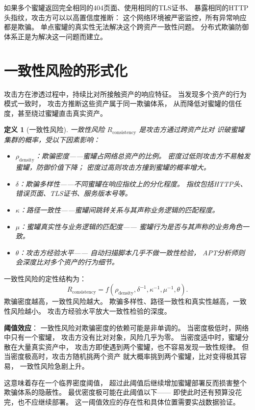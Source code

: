 \documentclass[11pt,a4paper]{article}
\newtheorem{definition}{定义}[section]
\begin{document}
如果多个蜜罐返回完全相同的404页面、使用相同的TLS证书、
暴露相同的HTTP头指纹，攻击方可以以高置信度推断：
这个网络环境被严密监控，所有异常响应都是欺骗。
单点蜜罐的真实性无法解决这个跨资产一致性问题。
分布式欺骗防御体系正是为解决这一问题而建立。

\section{一致性风险的形式化}

攻击方在渗透过程中，持续比对所接触资产的响应特征。
当发现多个资产的行为模式一致时，
攻击方推断这些资产属于同一欺骗体系，
从而降低对蜜罐的信任度，甚至绕过蜜罐直击真实资产。

\begin{definition}[一致性风险]
一致性风险 \(R_{\text{consistency}}\) 是攻击方通过跨资产比对
识破蜜罐集群的概率，受以下因素影响：
\begin{itemize}
    \item \(\rho_{\text{density}}\)：欺骗密度——蜜罐占网络总资产的比例。
          密度过低则攻击方不易触发蜜罐，防御价值下降；
          密度过高则攻击方撞到蜜罐的概率增大。
    \item \(\delta\)：欺骗多样性——不同蜜罐在响应指纹上的分化程度。
          指纹包括HTTP头、错误页面、TLS证书、服务版本号等。
    \item \(\kappa\)：路径一致性——蜜罐间跳转关系与其声称业务逻辑的匹配程度。
    \item \(\mu\)：蜜罐真实性与业务逻辑的匹配度——
          蜜罐行为是否与其声称的业务角色一致。
    \item \(\theta\)：攻击方经验水平——
          自动扫描脚本几乎不做一致性检验，
          APT分析师则会深度比对多个资产的行为细节。
\end{itemize}
\end{definition}

一致性风险的定性结构为：
\[
R_{\text{consistency}} = f(\rho_{\text{density}}, \delta^{-1}, \kappa^{-1}, \mu^{-1}, \theta).
\]
欺骗密度越高，一致性风险越大。
欺骗多样性、路径一致性和真实性越高，一致性风险越小。
攻击方经验水平放大一致性检验的深度。

\textbf{阈值效应}：
一致性风险对欺骗密度的依赖可能是非单调的。
当密度极低时，网络中只有一个蜜罐，
攻击方没有比对对象，风险几乎为零。
当密度适中时，蜜罐分散在大量真实资产中，
攻击方即使遇到两个蜜罐，也不容易发现一致性规律。
但当密度极高时，攻击方随机挑两个资产
就大概率挑到两个蜜罐，比对变得极其容易，
一致性风险急剧上升。

这意味着存在一个临界密度阈值，
超过此阈值后继续增加蜜罐部署反而损害整个欺骗体系的隐蔽性。
最优密度极可能在此阈值以下——
即使此时还有预算没花完，也不应继续部署。
这一阈值效应的存在性和具体位置需要实战数据验证。
\end{document}

